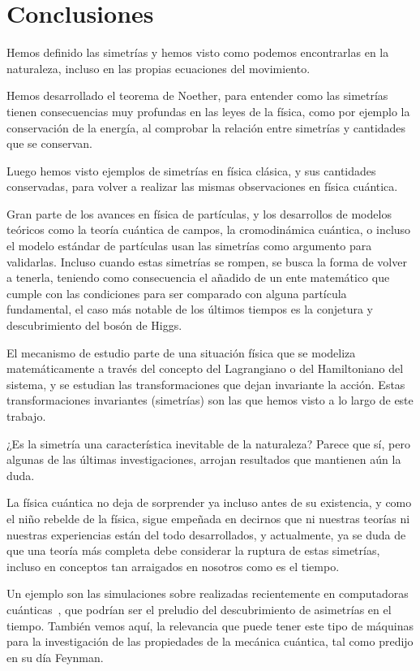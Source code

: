 \section{Conclusiones}\label{sec:conclusiones}
Hemos definido las simetrías y hemos visto como podemos encontrarlas en la naturaleza, incluso en las propias ecuaciones del movimiento.

Hemos desarrollado el teorema de Noether, para entender como las simetrías tienen consecuencias muy profundas en las leyes de la física, como por ejemplo la conservación de la energía, al comprobar la relación entre simetrías y cantidades que se conservan.

Luego hemos visto ejemplos de simetrías en física clásica, y sus cantidades conservadas, para volver a realizar las mismas observaciones en física cuántica.

Gran parte de los avances en física de partículas, y los desarrollos de modelos teóricos como la teoría cuántica de campos, la cromodinámica cuántica, o incluso el modelo estándar de partículas usan las simetrías como argumento para validarlas.
Incluso cuando estas simetrías se rompen, se busca la forma de volver a tenerla, teniendo como consecuencia el añadido de un ente matemático que cumple con las condiciones para ser comparado con alguna partícula fundamental, el caso más notable de los últimos tiempos es la conjetura y descubrimiento del bosón de Higgs.

El mecanismo de estudio parte de una situación física que se modeliza matemáticamente a través del concepto del Lagrangiano o del Hamiltoniano del sistema, y se estudian las transformaciones que dejan invariante la acción.
Estas transformaciones invariantes (simetrías) son las que hemos visto a lo largo de este trabajo.

¿Es la simetría una característica inevitable de la naturaleza?
Parece que sí, pero algunas de las últimas investigaciones, arrojan resultados que mantienen aún la duda.

La física cuántica no deja de sorprender ya incluso antes de su existencia, y como el niño rebelde de la física, sigue empeñada en decirnos que ni nuestras teorías ni nuestras experiencias están del todo desarrollados, y actualmente, ya se duda de que una teoría más completa debe considerar la ruptura de estas simetrías, incluso en conceptos tan arraigados en nosotros como es el tiempo.

Un ejemplo son las simulaciones sobre  realizadas recientemente en computadoras cuánticas~\cite{TC1,TC2}, que podrían ser el preludio del descubrimiento de asimetrías en el tiempo. También vemos aquí, la relevancia que puede tener este tipo de máquinas para la investigación de las propiedades de la mecánica cuántica, tal como predijo en su día Feynman.

